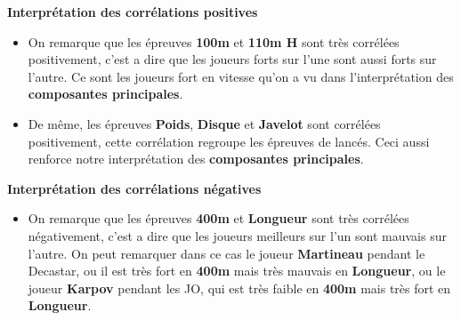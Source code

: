 \documentclass{article}
\begin{document}
\begin{flushleft}
\textbf{Interprétation des corrélations positives}
\end{flushleft}

\begin{itemize}
\item On remarque que les épreuves \textbf{100m} et \textbf{110m H} sont très corrélées positivement, c'est a dire que les joueurs forts sur l'une sont aussi forts sur l'autre. Ce sont les joueurs fort en vitesse qu'on a vu dans l'interprétation des \textbf{composantes principales}.
\item De même, les épreuves \textbf{Poids}, \textbf{Disque} et \textbf{Javelot} sont corrélées positivement, cette corrélation regroupe les épreuves de lancés. Ceci aussi renforce notre interprétation des \textbf{composantes principales}.
\end{itemize}

\begin{flushleft}
\textbf{Interprétation des corrélations négatives}
\end{flushleft}

\begin{itemize}
\item On remarque que les épreuves \textbf{400m} et \textbf{Longueur} sont très corrélées négativement, c'est a dire que les joueurs meilleurs sur l'un sont mauvais sur l'autre. On peut remarquer dans ce cas le joueur \textbf{Martineau} pendant le Decastar, ou il est très fort en \textbf{400m} mais très mauvais en \textbf{Longueur}, ou le joueur \textbf{Karpov} pendant les JO, qui est très faible en \textbf{400m} mais très fort en \textbf{Longueur}.
\end{itemize}
\end{document}
